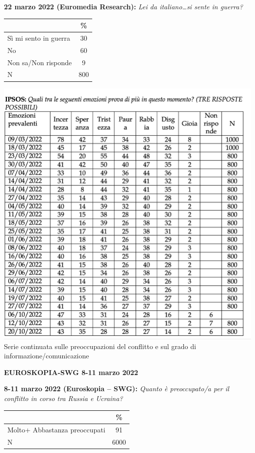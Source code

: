 \documentclass[
]{book}
\begin{document}
\textbf{22 marzo 2022 (Euromedia Research):} \emph{Lei da italiano\ldots si sente in guerra?}

\begin{longtable}[]{@{}lc@{}}
\toprule\noalign{}
& \% \\
\midrule\noalign{}
\endhead
\bottomrule\noalign{}
\endlastfoot
Sì mi sento in guerra & 30 \\
No & 60 \\
Non sa/Non risponde & 9 \\
N & 800 \\
\end{longtable}

\includegraphics{images/0028.png}
Serie continuata sulle preoccupazioni del conflitto e sul grado di informazione/comunicazione

\textbf{EUROSKOPIA-SWG 8-11 marzo 2022}

\textbf{8-11 marzo 2022 (Euroskopia -- SWG):} \emph{Quanto è preoccupato/a per il conflitto in corso tra Russia e Ucraina?}

\begin{longtable}[]{@{}lc@{}}
\toprule\noalign{}
& \% \\
\midrule\noalign{}
\endhead
\bottomrule\noalign{}
\endlastfoot
Molto+ Abbastanza preoccupati & 91 \\
N & 6000 \\
\end{longtable}
\end{document}
